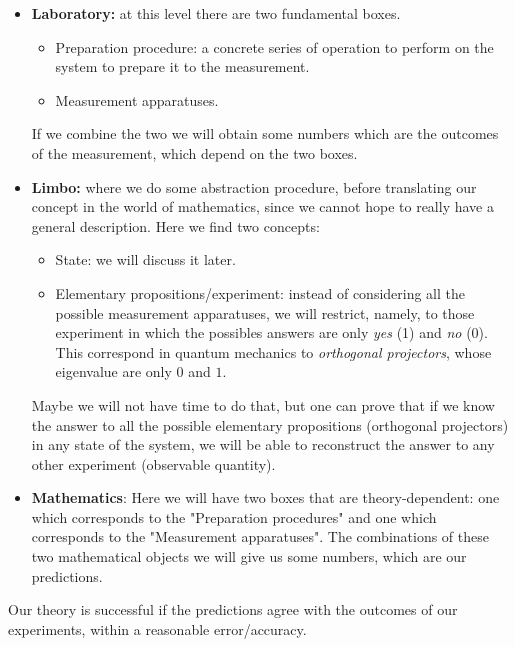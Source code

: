 \documentclass[../main.tex]{subfiles}
\begin{document}
\begin{itemize}
    \item \textbf{Laboratory:} at this level there are two fundamental boxes.
    \begin{itemize}
        \item {}Preparation procedure: a concrete series of operation to perform on the system to prepare it to the measurement.
        \item {}Measurement apparatuses.
    \end{itemize}
    If we combine the two we will obtain some numbers which are the outcomes of the measurement, which depend on the two boxes.
    \item \textbf{Limbo:} where we do some abstraction procedure, before translating our concept in the world of mathematics, since we cannot hope to really have a general description. Here we find two concepts:
    \begin{itemize}
        \item {}State: we will discuss it later.
        \item {}Elementary propositions/experiment: instead of considering all the possible measurement apparatuses, we will restrict, namely, to those experiment in which the possibles answers are only \textit{yes} (1) and \textit{no} (0). This correspond in quantum mechanics to  \textit{orthogonal projectors}, whose eigenvalue are only $0$ and $1$.
    \end{itemize}
    Maybe we will not have time to do that, but one can prove that if we know the answer to all the possible elementary propositions (orthogonal projectors) in any state of the system, we will be able to reconstruct the answer to any other experiment (observable quantity).
    \item \textbf{Mathematics}: Here we will have two boxes that are theory-dependent: one which corresponds to the "Preparation procedures" and one which corresponds to the "Measurement apparatuses". The combinations of these two mathematical objects we will give us some numbers, which are our predictions.
\end{itemize}
Our theory is successful if the predictions agree with the outcomes of our experiments, within a reasonable error/accuracy.
\end{document}
